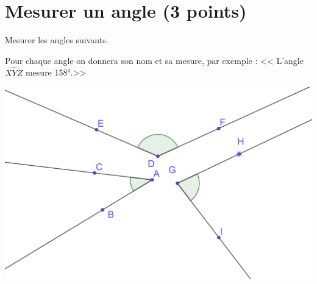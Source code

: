 \section{Mesurer un angle (3 points)}

\begin{questions}
	\question Mesurer les angles suivants. 
	
	Pour chaque angle on donnera son nom et sa mesure, par exemple  : << L'angle $\widehat{XYZ} $ mesure 158°.>>
	
	\begin{center}
		\includegraphics[scale=0.13]{img/mesures_v2}
	\end{center}
\end{questions}
